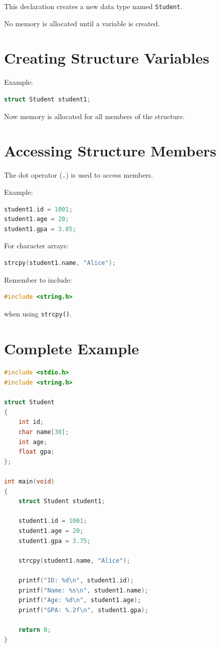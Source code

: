 \documentclass[12pt,openany]{book}
\begin{document}
This declaration creates a new data type named \texttt{Student}.

No memory is allocated until a variable is created.

\section{Creating Structure Variables}

Example:

\begin{lstlisting}[language=C]
struct Student student1;
\end{lstlisting}

Now memory is allocated for all members of the structure.

\section{Accessing Structure Members}

The dot operator (\texttt{.}) is used to access members.

Example:

\begin{lstlisting}[language=C]
student1.id = 1001;
student1.age = 20;
student1.gpa = 3.85;
\end{lstlisting}

For character arrays:

\begin{lstlisting}[language=C]
strcpy(student1.name, "Alice");
\end{lstlisting}

Remember to include:

\begin{lstlisting}[language=C]
#include <string.h>
\end{lstlisting}

when using \texttt{strcpy()}.

\section{Complete Example}

\begin{lstlisting}[language=C]
#include <stdio.h>
#include <string.h>

struct Student
{
    int id;
    char name[30];
    int age;
    float gpa;
};

int main(void)
{
    struct Student student1;

    student1.id = 1001;
    student1.age = 20;
    student1.gpa = 3.75;

    strcpy(student1.name, "Alice");

    printf("ID: %d\n", student1.id);
    printf("Name: %s\n", student1.name);
    printf("Age: %d\n", student1.age);
    printf("GPA: %.2f\n", student1.gpa);

    return 0;
}
\end{lstlisting}
\end{document}
